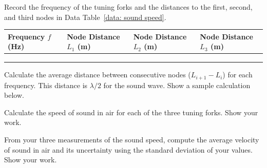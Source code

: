 \documentclass[addpoints]{physlabs}
\begin{document}
\begin{postlab}



    \filbreak
    \question[1] Record the frequency of the tuning forks and the distances to the first, second, and third nodes in Data Table~\ref{data: sound speed}.

    \begin{center}
        \captionsetup{font=normalsize}
        \renewcommand{\arraystretch}{2}
        \begin{tabular}{|>{\centering\arraybackslash}p{2.25cm}|>{\centering\arraybackslash}p{2.75cm}|>{\centering\arraybackslash}p{2.75cm}|>{\centering\arraybackslash}p{2.75cm}|}
            \hline
            \rowcolor{gray!20}
            \textbf{Frequency} $f$ (Hz) & \textbf{Node Distance} $L_1$ (m) & \textbf{Node Distance} $L_2$ (m) & \textbf{Node Distance} $L_3$ (m)
            \\
            \hline
            & & & \\ \hline
            & & & \\ \hline
            & & & \\ \hline
        \end{tabular}
    \end{center}

    \filbreak
    \question[2] Calculate the average distance between consecutive nodes ($L_{i+1}-L_i$) for each frequency. This distance is $\lambda/2$ for the sound wave. Show a sample calculation below.
    \begin{solution}[4cm]
    \end{solution}


    \filbreak
    \question[2] Calculate the speed of sound in air for each of the three tuning forks. Show your work.
    \begin{solution}[4cm]
    \end{solution}

    \filbreak
    \question[2] From your three measurements of the sound speed, compute the average velocity of sound in air and its uncertainty using the standard deviation of your values. Show your work.
    \begin{solution}[4cm]
    \end{solution}


\end{postlab}
\end{document}
